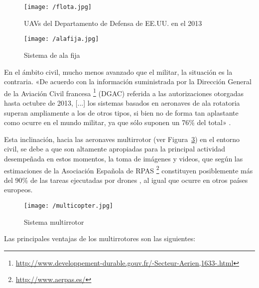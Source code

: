 \begin{figure}[!h]
\begin{center}
\texttt{[image: /flota.jpg]}
\caption[\acs{UAV}s del Departamento de Defensa de EE.UU. en el 2013]{\acs{UAV}s del Departamento de Defensa de EE.UU. en el 2013 \cite{ambitocivil2}}
\label{fig:flota}
\end{center}
\end{figure}

\begin{figure}[!h]
\begin{center}
\texttt{[image: /alafija.jpg]}
\caption[Sistema de ala fija]{Sistema de ala fija}
\label{fig:alafija}
\end{center}
\end{figure}

En el ámbito civil, mucho menos avanzado que el militar, la situación es la contraria. «De acuerdo con la información suministrada por la Dirección General de la Aviación Civil francesa \footnote{\url{http://www.developpement-durable.gouv.fr/-Secteur-Aerien,1633-.html}} (DGAC) referida a las autorizaciones otorgadas hasta octubre de 2013, [...] los sistemas basados en aeronaves de ala rotatoria superan ampliamente
a los de otros tipos, si bien no de forma tan aplastante como ocurre en el mundo militar, ya que sólo suponen un 76\% del total» \cite{dron2}.

\clearpage

Esta inclinación, hacia las aeronaves multirrotor (ver Figura~\ref{fig:multirrotor}) en el entorno civil, se debe a que son altamente apropiadas para la principal actividad desempeñada en estos momentos, la toma de imágenes y videos, que según las estimaciones de la Asociación Española de RPAS \footnote{\url{http://www.aerpas.es/}} constituyen posiblemente más del 90\% de las tareas ejecutadas por drones \cite{AERPAS}, al igual que ocurre en otros países europeos.

\begin{figure}[!h]
\begin{center}
\texttt{[image: /multicopter.jpg]}
\caption[Sistema multirrotor]{Sistema multirrotor}
\label{fig:multirrotor}
\end{center}
\end{figure}

Las principales ventajas de los multirrotores son las siguientes:

